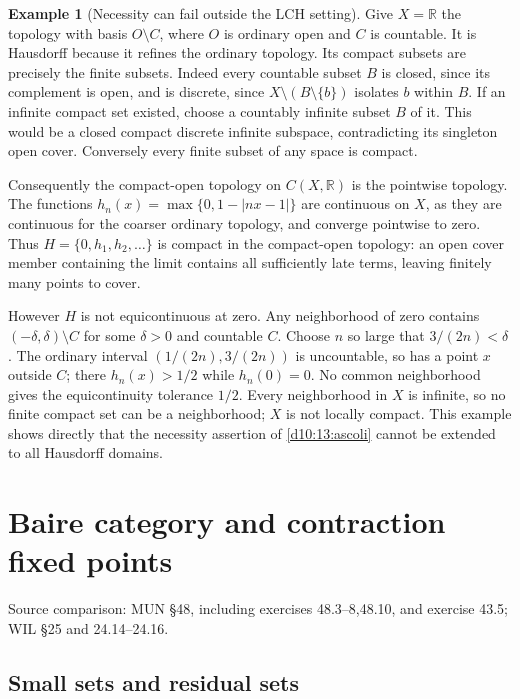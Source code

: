 \documentclass[11pt,oneside,openany]{book}
\theoremstyle{definition}
\newtheorem{example}[theorem]{Example}
\theoremstyle{remark}
\newcommand{\R}{\mathbb R}\newcommand{\C}{\mathbb C}
\newcommand{\source}[1]{\par\begingroup\small\sffamily\color{black!65}Source comparison: #1\par\endgroup}
\begin{document}
\begin{example}[Necessity can fail outside the LCH setting]\label{d10:13:ascoli-nonlch}
Give $X=\R$ the topology with basis $O\setminus C$, where $O$ is ordinary open and $C$ is countable. It is Hausdorff because it refines the ordinary topology. Its compact subsets are precisely the finite subsets. Indeed every countable subset $B$ is closed, since its complement is open, and is discrete, since $X\setminus(B\setminus\{b\})$ isolates $b$ within $B$. If an infinite compact set existed, choose a countably infinite subset $B$ of it. This would be a closed compact discrete infinite subspace, contradicting its singleton open cover. Conversely every finite subset of any space is compact.

Consequently the compact-open topology on $C(X,\R)$ is the pointwise topology. The functions $h_n(x)=\max\{0,1-|nx-1|\}$ are continuous on $X$, as they are continuous for the coarser ordinary topology, and converge pointwise to zero. Thus $H=\{0,h_1,h_2,\ldots\}$ is compact in the compact-open topology: an open cover member containing the limit contains all sufficiently late terms, leaving finitely many points to cover.

However $H$ is not equicontinuous at zero. Any neighborhood of zero contains $(-\delta,\delta)\setminus C$ for some $\delta>0$ and countable $C$. Choose $n$ so large that $3/(2n)<\delta$. The ordinary interval $(1/(2n),3/(2n))$ is uncountable, so has a point $x$ outside $C$; there $h_n(x)>1/2$ while $h_n(0)=0$. No common neighborhood gives the equicontinuity tolerance $1/2$. Every neighborhood in $X$ is infinite, so no finite compact set can be a neighborhood; $X$ is not locally compact. This example shows directly that the necessity assertion of \cref{d10:13:ascoli} cannot be extended to all Hausdorff domains.
\end{example}



\chapter[Baire category and contractions]{Baire category and contraction fixed points}\label{ch:d10-14}
\source{MUN \S48, including exercises 48.3--8,48.10, and exercise 43.5; WIL \S25 and 24.14--24.16.}

\section{Small sets and residual sets}
\end{document}
